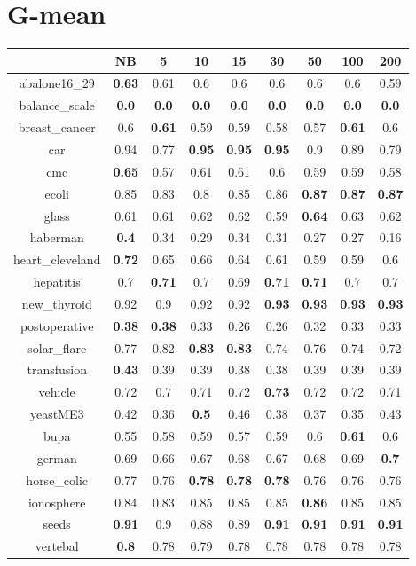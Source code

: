 \documentclass{article}%
\begin{document}
%
\section*{G{-}mean}%
\begin{tabular}{c|cccccccc}%
\hline%
&NB&5&10&15&30&50&100&200\\%
\hline%
abalone16\_29&\textbf{0.63}&0.61&0.6&0.6&0.6&0.6&0.6&0.59\\%
\hline%
balance\_scale&\textbf{0.0}&\textbf{0.0}&\textbf{0.0}&\textbf{0.0}&\textbf{0.0}&\textbf{0.0}&\textbf{0.0}&\textbf{0.0}\\%
\hline%
breast\_cancer&0.6&\textbf{0.61}&0.59&0.59&0.58&0.57&\textbf{0.61}&0.6\\%
\hline%
car&0.94&0.77&\textbf{0.95}&\textbf{0.95}&\textbf{0.95}&0.9&0.89&0.79\\%
\hline%
cmc&\textbf{0.65}&0.57&0.61&0.61&0.6&0.59&0.59&0.58\\%
\hline%
ecoli&0.85&0.83&0.8&0.85&0.86&\textbf{0.87}&\textbf{0.87}&\textbf{0.87}\\%
\hline%
glass&0.61&0.61&0.62&0.62&0.59&\textbf{0.64}&0.63&0.62\\%
\hline%
haberman&\textbf{0.4}&0.34&0.29&0.34&0.31&0.27&0.27&0.16\\%
\hline%
heart\_cleveland&\textbf{0.72}&0.65&0.66&0.64&0.61&0.59&0.59&0.6\\%
\hline%
hepatitis&0.7&\textbf{0.71}&0.7&0.69&\textbf{0.71}&\textbf{0.71}&0.7&0.7\\%
\hline%
new\_thyroid&0.92&0.9&0.92&0.92&\textbf{0.93}&\textbf{0.93}&\textbf{0.93}&\textbf{0.93}\\%
\hline%
postoperative&\textbf{0.38}&\textbf{0.38}&0.33&0.26&0.26&0.32&0.33&0.33\\%
\hline%
solar\_flare&0.77&0.82&\textbf{0.83}&\textbf{0.83}&0.74&0.76&0.74&0.72\\%
\hline%
transfusion&\textbf{0.43}&0.39&0.39&0.38&0.38&0.39&0.39&0.39\\%
\hline%
vehicle&0.72&0.7&0.71&0.72&\textbf{0.73}&0.72&0.72&0.71\\%
\hline%
yeastME3&0.42&0.36&\textbf{0.5}&0.46&0.38&0.37&0.35&0.43\\%
\hline%
bupa&0.55&0.58&0.59&0.57&0.59&0.6&\textbf{0.61}&0.6\\%
\hline%
german&0.69&0.66&0.67&0.68&0.67&0.68&0.69&\textbf{0.7}\\%
\hline%
horse\_colic&0.77&0.76&\textbf{0.78}&\textbf{0.78}&\textbf{0.78}&0.76&0.76&0.76\\%
\hline%
ionosphere&0.84&0.83&0.85&0.85&0.85&\textbf{0.86}&0.85&0.85\\%
\hline%
seeds&\textbf{0.91}&0.9&0.88&0.89&\textbf{0.91}&\textbf{0.91}&\textbf{0.91}&\textbf{0.91}\\%
\hline%
vertebal&\textbf{0.8}&0.78&0.79&0.78&0.78&0.78&0.78&0.78\\%
\hline%
\end{tabular}

%
\end{document}
